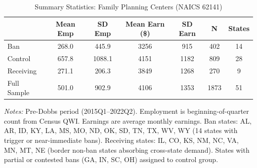 \begin{table}[H]
\centering
\caption{Summary Statistics: Family Planning Centers (NAICS 62141)}
\label{tab:summary}
\begin{threeparttable}
\begin{tabular}{lcccccc}
\toprule
 & Mean Emp & SD Emp & Mean Earn (\$) & SD Earn & N & States \\
\midrule
Ban & 268.0 & 445.9 & 3256 & 915 & 402 & 14 \\
Control & 657.8 & 1088.1 & 4151 & 1182 & 809 & 28 \\
Receiving & 271.1 & 206.3 & 3849 & 1268 & 270 & 9 \\
Full Sample & 501.0 & 902.9 & 4106 & 1353 & 1873 & 51 \\
\bottomrule
\end{tabular}
\begin{tablenotes}[flushleft]
\small
\item \textit{Notes:} Pre-Dobbs period (2015Q1--2022Q2). Employment is beginning-of-quarter count from Census QWI. Earnings are average monthly earnings. Ban states: AL, AR, ID, KY, LA, MS, MO, ND, OK, SD, TN, TX, WV, WY (14 states with trigger or near-immediate bans). Receiving states: IL, CO, KS, NM, NC, VA, MN, MT, NE (border non-ban states absorbing cross-state demand). States with partial or contested bans (GA, IN, SC, OH) assigned to control group.
\end{tablenotes}
\end{threeparttable}
\end{table}

